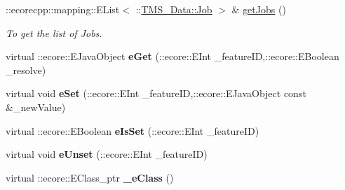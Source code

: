 \begin{DoxyCompactItemize}
::ecorecpp::mapping::EList$<$ ::\hyperlink{classTMS__Data_1_1Job}{TMS\_\-Data::Job} $>$ \& \hyperlink{classTMS__Data_1_1ListJobs_a84d2507c41dfeb84ac25354ca802f3d8}{getJobs} ()
\begin{DoxyCompactList}\small\item\em To get the list of Jobs. \item\end{DoxyCompactList}\item 
\hypertarget{classTMS__Data_1_1ListJobs_a4f4c80b8dabb2bf0e6e7d313d863b4b5}{
virtual ::ecore::EJavaObject {\bfseries eGet} (::ecore::EInt \_\-featureID,::ecore::EBoolean \_\-resolve)}
\label{classTMS__Data_1_1ListJobs_a4f4c80b8dabb2bf0e6e7d313d863b4b5}

\item 
\hypertarget{classTMS__Data_1_1ListJobs_a2f1fee5de62727ad1d443689b4398ce2}{
virtual void {\bfseries eSet} (::ecore::EInt \_\-featureID,::ecore::EJavaObject const \&\_\-newValue)}
\label{classTMS__Data_1_1ListJobs_a2f1fee5de62727ad1d443689b4398ce2}

\item 
\hypertarget{classTMS__Data_1_1ListJobs_a1fbdb9dfde25d9d90b3b650de6cf6a45}{
virtual ::ecore::EBoolean {\bfseries eIsSet} (::ecore::EInt \_\-featureID)}
\label{classTMS__Data_1_1ListJobs_a1fbdb9dfde25d9d90b3b650de6cf6a45}

\item 
\hypertarget{classTMS__Data_1_1ListJobs_a5cbd60de407b12d0d24baddd0f972eb5}{
virtual void {\bfseries eUnset} (::ecore::EInt \_\-featureID)}
\label{classTMS__Data_1_1ListJobs_a5cbd60de407b12d0d24baddd0f972eb5}

\item 
\hypertarget{classTMS__Data_1_1ListJobs_a50f1ec971ede0fd820052407c3857679}{
virtual ::ecore::EClass\_\-ptr {\bfseries \_\-eClass} ()}
\label{classTMS__Data_1_1ListJobs_a50f1ec971ede0fd820052407c3857679}

\end{DoxyCompactItemize}
